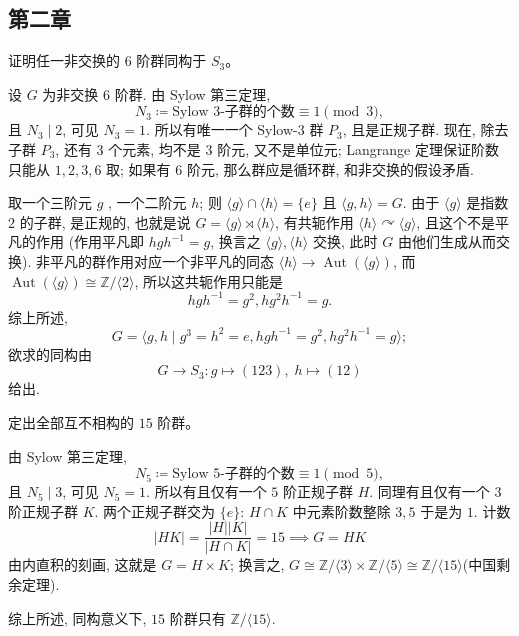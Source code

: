 \subsection{第二章}
\setcounter{pb}{21}

\begin{problem}
    证明任一非交换的 $6$ 阶群同构于 $S_3 $。
\end{problem}

\begin{solution}
    设 $G$ 为非交换 $6$ 阶群. 由 Sylow 第三定理,  
        \[
            N_{3}\coloneqq \text{Sylow $3$-子群的个数}\equiv 1\pmod3,
        \]
    且 $N_{3}\mid 2$, 可见 $N_{3}=1$. 所以有唯一一个 Sylow-$3$ 群 $P_{3}$, 且是正规子群. 
    现在, 除去子群 $P_{3}$, 还有 $3$ 个元素, 均不是 $3$ 阶元, 又不是单位元; Langrange 定理保证阶数只能从 $1,2,3,6$ 取; 
    如果有 $6$ 阶元, 那么群应是循环群, 和非交换的假设矛盾. 
    \par 取一个三阶元 $g$ , 一个二阶元 $h$; 则 $\langle g \rangle\cap \langle h \rangle=\{e\}$ 且 $\langle g,h \rangle=G$. 
    由于 $\langle g \rangle$ 是指数 $2$ 的子群, 是正规的, 也就是说 $G=\langle g \rangle \rtimes \langle h \rangle$, 有共轭作用 $\langle h \rangle \curvearrowright \langle g \rangle$, 且这个不是平凡的作用 
    (作用平凡即 $h g h^{-1}= g$, 换言之 $\langle g \rangle, \langle h \rangle$ 交换, 此时 $G$ 由他们生成从而交换). 
    非平凡的群作用对应一个非平凡的同态 $\langle h \rangle\to \operatorname{Aut}(\langle g \rangle)$, 而 $\operatorname{Aut}(\langle g \rangle)\cong \mathbb{Z}/\langle 2 \rangle$, 
    所以这共轭作用只能是
        \[
            h g h^{-1}=g^{2}, h g^{2} h^{-1}=g.
        \]
    综上所述, 
        \[
            G=\langle g,h\mid g^{3}=h^{2}=e, h g h^{-1}=g^{2}, h g^{2} h^{-1}=g \rangle;
        \]
    欲求的同构由 
        \[
            G\to S_{3} \colon g\mapsto (1 2 3),\; h\mapsto (1 2)
        \]
    给出.
\end{solution}
\begin{problem}
    定出全部互不相构的 $15$ 阶群。
\end{problem}

\begin{solution}
    由 Sylow 第三定理,  
        \[
            N_{5}\coloneqq \text{Sylow $5$-子群的个数}\equiv 1\pmod5,
        \]
    且 $N_{5}\mid 3$, 可见 $N_{5}=1$. 所以有且仅有一个 $5$ 阶正规子群 $H$. 
    同理有且仅有一个 $3$ 阶正规子群 $K$. 两个正规子群交为 $\{e\}$: $H\cap K$ 中元素阶数整除 $3,5$ 于是为 $1$. 
    计数 
        \[
            |H K|=\frac{|H||K|}{|H\cap K|}=15\implies G= H K
        \]
    由内直积的刻画, 这就是 $G=H\times K$; 换言之, $G\cong \mathbb{Z}/\langle 3 \rangle\times\mathbb{Z}/\langle 5 \rangle\cong\mathbb{Z}/\langle 15 \rangle$(中国剩余定理). 
    \par 综上所述, 同构意义下, $15$ 阶群只有 $\mathbb{Z}/\langle 15 \rangle$.
\end{solution}

